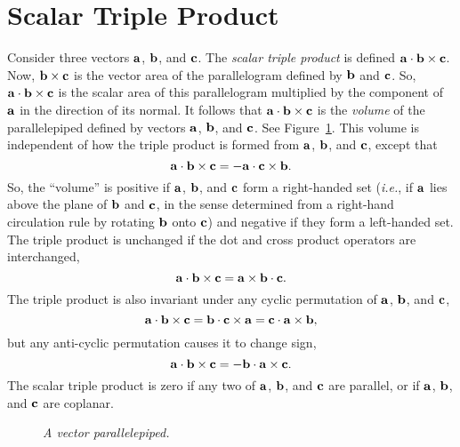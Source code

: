 \section{Scalar Triple Product}\label{sstp}
Consider three vectors ${\bf a}$, ${\bf b}$, and ${\bf c}$. The {\em scalar triple product}\/ is
defined ${\bf a}\cdot {\bf b}\times {\bf c}$. Now, ${\bf b}\times {\bf c}$ is the vector area of
the parallelogram defined by ${\bf b}$ and ${\bf c}$. So, ${\bf a}\cdot {\bf b} \times{\bf c}$
is the scalar area of this parallelogram multiplied by the component of ${\bf a}$ in the direction
of its  normal. It follows that ${\bf a}\cdot {\bf b}\times{\bf c}$ is
the {\em volume}\/ of the parallelepiped defined by vectors ${\bf a}$, ${\bf b}$, and ${\bf c}$. See Figure~\ref{f9a}.
This volume is independent of how the triple product is formed from ${\bf a}$, ${\bf b}$, 
and ${\bf c}$, except that 
\begin{equation}
{\bf a} \cdot {\bf b}\times{\bf c} = - {\bf a} \cdot {\bf c}\times{\bf b}.
\end{equation}
So, the ``volume'' is positive if ${\bf a}$, ${\bf b}$, and ${\bf c}$ form a right-handed set
({\em i.e.}, if ${\bf a}$ lies above the plane of ${\bf b}$ and ${\bf c}$,
in the sense determined from a right-hand circulation rule by rotating
${\bf b}$ onto ${\bf c}$) and negative if they form a left-handed set. 
The triple product is unchanged if the dot and cross product operators are interchanged,
\begin{equation}
{\bf a} \cdot {\bf b}\times{\bf c} = {\bf a} \times{\bf b} \cdot{\bf c}.
\end{equation}
The triple product is also invariant under any cyclic permutation of ${\bf a}$, ${\bf b}$,
and ${\bf c}$,
\begin{equation}
{\bf a} \cdot {\bf b} \times{\bf c} = {\bf b} \cdot {\bf c} \times{\bf a} = 
{\bf c} \cdot {\bf a} \times{\bf b},
\end{equation}
but any anti-cyclic permutation causes it to change sign,
\begin{equation}
{\bf a} \cdot  {\bf b} \times{\bf c} = - {\bf b} \cdot {\bf a} \times{\bf c}.
\end{equation}
The scalar triple product is zero if any
two of ${\bf a}$, ${\bf b}$, and ${\bf c}$ are parallel, or if ${\bf a}$, ${\bf b}$, and ${\bf c}$
are coplanar. 
\begin{figure}
\epsfysize=1.5in
\centerline{}
\caption{\em A vector parallelepiped.}\label{f9a}
\end{figure}


